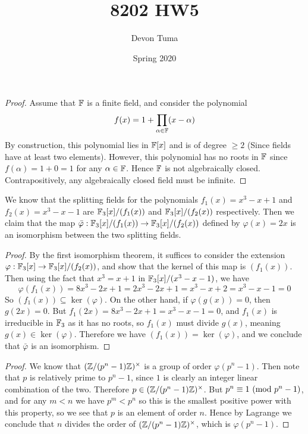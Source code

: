 \documentclass[11pt]{article}
\title{8202 HW5}
\author{Devon Tuma}
\date{Spring 2020}
\begin{document}
\maketitle

\begin{proof}
  Assume that $\mathbb{F}$ is a finite field, and consider the polynomial
  \begin{equation*}
    f(x) = 1 + \prod_{\alpha \in \mathbb{F}} (x - \alpha)
  \end{equation*}
  By construction, this polynomial lies in $\mathbb{F}[x]$ and is of degree $\ge 2$ (Since fields have at least two elements).
  However, this polynomial has no roots in $\mathbb{F}$ since $f(\alpha) = 1 + 0 = 1$ for any $\alpha \in \mathbb{F}$.
  Hence $\mathbb{F}$ is not algebraically closed.
  Contrapositively, any algebraically closed field must be infinite.
\end{proof}


We know that the splitting fields for the polynomials $f_1(x) = x^3-x+1$ and $f_2(x) = x^3-x-1$ are $\mathbb{F}_3[x]/(f_1(x))$ and $\mathbb{F}_3[x]/(f_2(x))$ respectively.
Then we claim that the map $\bar\varphi: \mathbb{F}_3[x]/(f_1(x)) \rightarrow \mathbb{F}_3[x]/(f_2(x))$ defined by $\varphi(x) = 2x$ is an isomorphism between the two splitting fields.
\begin{proof}
  By the first isomorphism theorem, it suffices to consider the extension $\varphi : \mathbb{F}_3[x] \rightarrow \mathbb{F}_3[x]/(f_2(x))$, and show that the kernel of this map is $(f_1(x))$.
  Then using the fact that $x^3 = x+1$ in $\mathbb{F}_3[x]/(x^3-x-1)$, we have
  \begin{equation*}
    \varphi(f_1(x))
    = 8x^3 - 2x + 1
    = 2x^3 - 2x + 1
    = x^3 - x + 2
    = x^3 - x - 1
    = 0
  \end{equation*}
  So $(f_1(x)) \subseteq \ker(\varphi)$.
  On the other hand, if $\varphi(g(x)) = 0$, then $g(2x) = 0$.
  But $f_1(2x) = 8x^3 - 2x + 1 = x^3 - x -1 = 0$, and $f_1(x)$ is irreducible in $\mathbb{F}_3$ as it has no roots, so $f_1(x)$ must divide $g(x)$, meaning $g(x) \in \ker(\varphi)$.
  Therefore we have $(f_1(x)) = \ker(\varphi)$, and we conclude that $\bar\varphi$ is an isomorphism.
\end{proof}


\begin{proof}
  We know that $(\mathbb{Z}/(p^n-1)\mathbb{Z})^\times$ is a group of order $\varphi(p^n-1)$.
  Then note that $p$ is relatively prime to $p^n-1$, since $1$ is clearly an integer linear combination of the two.
  Therefore $p \in (\mathbb{Z}/(p^n-1)\mathbb{Z})^\times$.
  But $p^n \equiv 1\ (\text{mod}\ p^n-1)$, and for any $m < n$ we have $p^m < p^n$ so this is the smallest positive power with this property, so we see that $p$ is an element of order $n$.
  Hence by Lagrange we conclude that $n$ divides the order of $(\mathbb{Z}/(p^n-1)\mathbb{Z})^\times$, which is $\varphi(p^n-1)$.
\end{proof}
\end{document}
